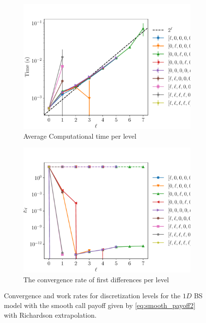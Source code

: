 \documentclass[11pt]{article}
\begin{document}
\begin{figure}[!h]
	\centering
	\begin{subfigure}{.5\textwidth}
		\centering
		\includegraphics[width=0.95\linewidth]{./figures/1D_BS_8_16_steps_smooth_second_payoff_eps_10_5_richardson/level_work.pdf}
		\caption{Average Computational time per level}
		\label{fig:misc_1D_BS_8_16_steps_smooth_second_payoff_eps_10_sub3}
	\end{subfigure}%
	\begin{subfigure}{.5\textwidth}
		\centering
		\includegraphics[width=0.95\linewidth]{./figures/1D_BS_8_16_steps_smooth_second_payoff_eps_10_5_richardson/levels_error_rate.pdf}
		\caption{ The convergence rate of first differences per level}
		\label{fig:misc_1D_BS_8_16_steps_smooth_second_payoff_eps_10_5_sub4}
	\end{subfigure}%
	\caption{Convergence and work rates for discretization levels for the $1D$ BS model with the smooth call payoff given by \eqref{eq:smooth_payoff2} with Richardson extrapolation.}
	\label{fig:misc_1D_BS_8_16_steps_smooth_second_payoff_eps_10_5_2}
\end{figure}
\newpage
\end{document}
